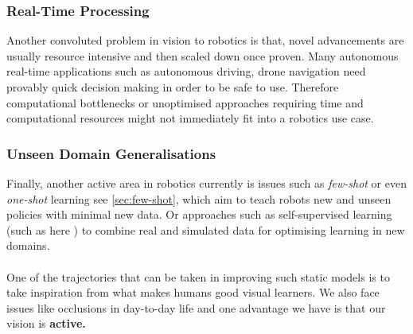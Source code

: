     \subsubsection{Real-Time Processing}
    Another convoluted problem in vision to robotics is that, novel advancements are usually resource intensive and then scaled down once proven. Many autonomous real-time  applications such as autonomous driving, drone navigation need provably quick decision making in order to be safe to use. Therefore computational bottlenecks or unoptimised approaches requiring time and computational resources might not immediately fit into a robotics use case.

    \subsubsection{Unseen Domain Generalisations}
    Finally, another active area in robotics currently is issues such as \emph{few-shot} or even \emph{one-shot} learning see \ref{sec:few-shot}, which aim to teach robots new and unseen policies with minimal new data. Or approaches such as self-supervised learning (such as here \cite{lim2022real2sim2real, huang2021robot}) to combine real and simulated data for optimising learning in new domains.
    \\\\
    One of the trajectories that can be taken in improving such static models is to take inspiration from what makes humans good visual learners. We also face issues like occlusions in day-to-day life and one advantage we have is that our vision is \textbf{active.}
    
  

    